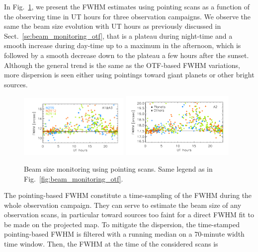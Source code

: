 In Fig.~\ref{fig:beam_monitoring_pointing}, we present the FWHM
estimates using pointing scans as a function of the observing time in
UT hours for three observation campaigns. We observe the same the beam
size evolution with UT hours as previously discussed in
Sect.~\ref{se:beam_monitoring_otf}, that is a plateau during night-time
and a smooth increase during day-time up to a maximum in the
afternoon, which is followed by a smooth decrease down to the plateau
a few hours after the sunset. Although the general trend is the same
as the OTF-based FWHM variations, more dispersion is seen either using
pointings toward giant planets or other bright sources.
%
\begin{figure}[ht!]
  \begin{center}
    \includegraphics[clip=true, trim={0.9cm, 0.5cm, 0.5cm, 0.5cm}, width=0.4725\textwidth]{Figures/Beams/Beam_monitoring_with_pointings_vs_ut_1mm.pdf}
    \includegraphics[clip=true, trim={0.5cm, 0.5cm, 0.5cm, 0.5cm}, width=0.4875\textwidth]{Figures/Beams/Beam_monitoring_with_pointings_vs_ut_a2.pdf}
    \caption[Beam size monitoring using pointing scans]{Beam size
      monitoring using pointing scans. Same legend as in
      Fig.~\ref{fig:beam_monitoring_otf}.} 
\label{fig:beam_monitoring_pointing}
\end{center}
\end{figure}
%
The pointing-based FWHM constitute a time-sampling of the FWHM during
the whole observation campaign. They can serve to estimate the beam
size of any observation scans, in particular
toward sources too faint for a direct FWHM fit to be made on the
projected map. To mitigate the dispersion, the time-stamped
pointing-based FWHM is filtered with a running median on a 70-minute
width time window. Then, the FWHM at the time of the considered scans is

